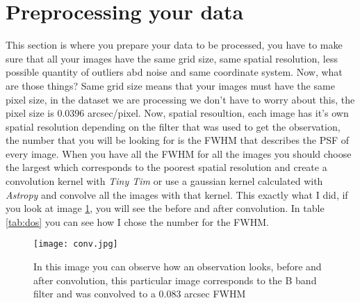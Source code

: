 \documentclass[11pt,fleqn]{book} %
\begin{document}
																																																																																																																																																																																	      \section{Preprocessing your data}
																																																																																																																																																																																	      This section is where you prepare your data to be processed, you have to make sure that all your images have the same grid size, same spatial resolution, less possible quantity of outliers abd noise and same coordinate system. Now, what are those things? Same grid size means that your images must have the same pixel size, in the dataset we are processing we don't have to worry about this, the pixel size is 0.0396 arcsec/pixel. Now, spatial resoultion, each image has it's own spatial resolution depending on the filter that was used to get the observation, the number that you will be looking for is the FWHM that describes the PSF of every image. When you have all the FWHM for all the images you should choose the largest which corresponds to the poorest spatial resolution and create a convolution kernel with \emph{Tiny Tim} or use a gaussian kernel calculated with \emph{Astropy} and convolve all the images with that kernel. This exactly what I did, if you look at image \ref{img:conv}, you will see the before and after convolution. In table \ref{tab:dos} you can see how I chose the number for the FWHM.

																																																																																																																																																																																	      \begin{figure}[h]
																																																																																																																																																																																	      	\centering
																																																																																																																																																																																		    \texttt{[image: conv.jpg]}
																																																																																																																																																																																		        \caption{In this image you can observe how an observation looks, before and after convolution, this particular image corresponds to the B band filter and was convolved to a 0.083 arcsec FWHM}
																																																																																																																																																																																			    \label{img:conv}
																																																																																																																																																																																			    \end{figure}
\end{document}
